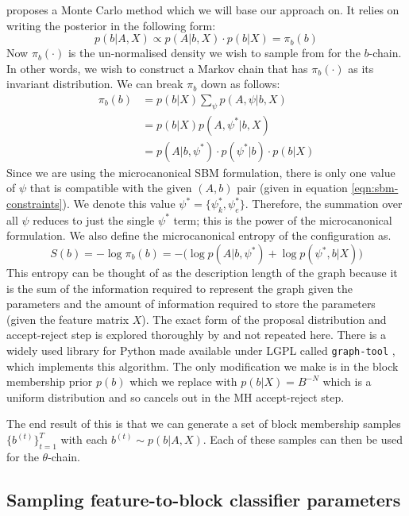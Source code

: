 \citet{Peixoto-MCMC} proposes a Monte Carlo method which we will base our approach on. It relies on writing the posterior in the following form:
%
\begin{equation}
	p(b | A, X) \propto p(A | b, X) \cdot p(b | X) = \pi_b(b)
\end{equation}
%
Now $\pi_b(\cdot)$ is the un-normalised density we wish to sample from for the $b$-chain. In other words, we wish to construct a Markov chain that has $\pi_b(\cdot)$ as its invariant distribution. We can break $\pi_b$ down as follows:
%
\begin{align*}
	\pi_b(b) &= p(b|X) \sum_{\psi} \nolimits p(A , \psi | b, X) \\
	&= p(b|X) p(A, \psi^* | b, X) \\
	&= p(A | b, \psi^*) \cdot p(\psi^* | b) \cdot p(b | X)
\end{align*}
%
Since we are using the microcanonical SBM formulation, there is only one value of $\psi$ that is compatible with the given $(A, b)$ pair (given in equation \ref{eqn:sbm-constraints}). We denote this value $\psi^* = \{\psi_k^*, \psi_e^*\}$. Therefore, the summation over all $\psi$ reduces to just the single $\psi^*$ term; this is the power of the microcanonical formulation. We also define the microcanonical entropy of the configuration as.
%
\begin{equation}
	S(b) = - \log \pi_b(b) = - \Big( \log p(A | b, \psi^*) + \log p(\psi^*, b | X) \Big)
	\label{eqn:dl-form}
\end{equation}
%
This entropy can be thought of as the description length of the graph because it is the sum of the information required to represent the graph given the parameters and the amount of information required to store the parameters (given the feature matrix $X$). The exact form of the proposal distribution and accept-reject step is explored thoroughly by \citet{Peixoto-MCMC} and not repeated here. There is a widely used library for Python made available under LGPL called \verb*|graph-tool| \cite{peixoto_graph-tool_2014}, which implements this algorithm. The only modification we make is in the block membership prior $p(b)$ which we replace with $p(b|X)=B^{-N}$ which is a uniform distribution and so cancels out in the MH accept-reject step.

The end result of this is that we can generate a set of block membership samples $\{b^{(t)}\}_{t=1}^{T}$ with each $b^{(t)} \sim p(b | A, X)$. Each of these samples can then be used for the $\theta$-chain.

\subsection{Sampling feature-to-block classifier parameters}

